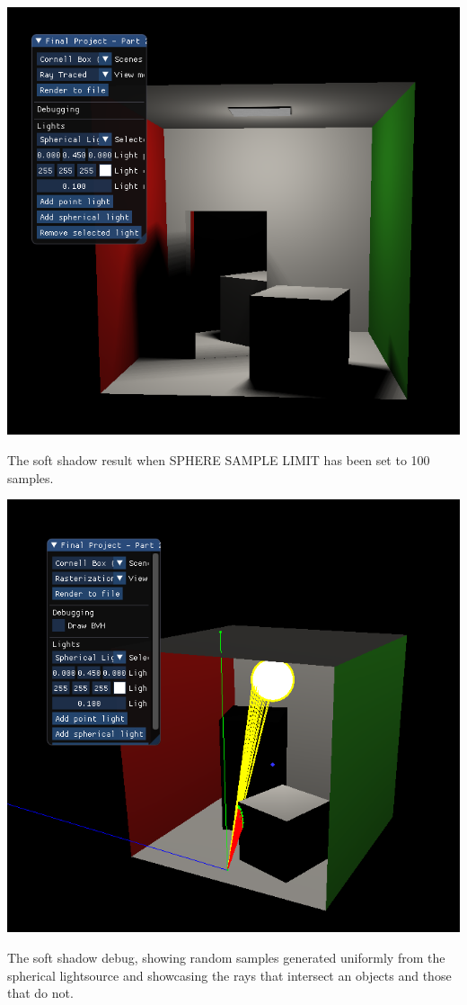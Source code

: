 \documentclass{article}
\begin{document}
    \begin{center}
        \includegraphics[scale=0.70]{images/softshadow_showcase.png}

        The soft shadow result when SPHERE SAMPLE LIMIT has been set to 100 samples.

        \includegraphics[scale=0.70]{images/softshadowdebug.png}

        The soft shadow debug, showing random samples generated uniformly from the spherical lightsource and showcasing the rays that intersect an objects and those that do not.  

    \end{center}
\end{document}
